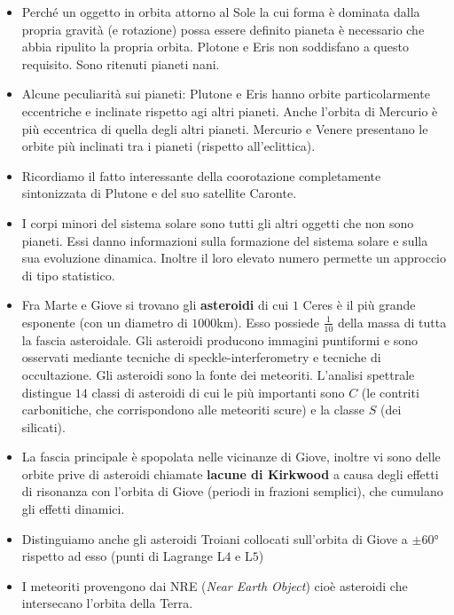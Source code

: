 \documentclass[11pt,a4paper]{article}
\begin{document}
\begin{itemize}
\item Perché un oggetto in orbita attorno al Sole la cui forma è dominata dalla propria gravità (e rotazione) possa essere definito pianeta è necessario che abbia ripulito la propria orbita. Plotone e Eris non soddisfano a questo requisito. Sono ritenuti pianeti nani.

\item Alcune peculiarità sui pianeti: Plutone e Eris hanno orbite particolarmente eccentriche e inclinate rispetto agi altri pianeti. Anche l'orbita di Mercurio è più eccentrica di quella degli altri pianeti. Mercurio e Venere presentano le orbite più inclinati tra i pianeti (rispetto all'eclittica).

\item Ricordiamo il fatto interessante della coorotazione completamente sintonizzata di Plutone e del suo satellite Caronte.

\item I corpi minori del sistema solare sono tutti gli altri oggetti che non sono pianeti. Essi danno informazioni sulla formazione del sistema solare e sulla sua evoluzione dinamica. Inoltre il loro elevato numero permette un approccio di tipo statistico.

\item Fra Marte e Giove si trovano gli \textbf{asteroidi} di cui $1$ Ceres è il più grande esponente (con un diametro di $1000$km). Esso possiede $\frac{1}{10}$ della massa di tutta la fascia asteroidale. Gli asteroidi producono immagini puntiformi e sono osservati mediante tecniche di speckle-interferometry e tecniche di occultazione. Gli asteroidi sono la fonte dei meteoriti. L'analisi spettrale distingue $14$ classi di asteroidi di cui le più importanti sono $C$ (le contriti carbonitiche, che corrispondono alle meteoriti scure) e la classe $S$ (dei silicati).

\item La fascia principale è spopolata nelle vicinanze di Giove, inoltre vi sono delle orbite prive di asteroidi chiamate \textbf{lacune di Kirkwood} a causa degli effetti di risonanza con l'orbita di Giove (periodi in frazioni semplici), che cumulano gli effetti dinamici.

\item Distinguiamo anche gli asteroidi Troiani collocati sull'orbita di Giove a $\pm 60°$ rispetto ad esso (punti di Lagrange L$4$ e L$5$)

\item I meteoriti provengono dai NRE (\textit{Near Earth Object}) cioè asteroidi che intersecano l'orbita della Terra. 


\end{itemize}
\end{document}

